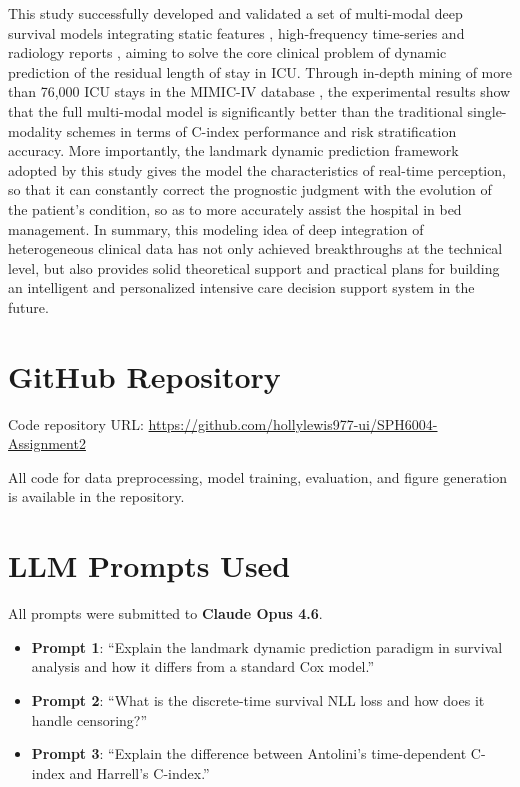 \documentclass[10pt, a4paper]{article}
\begin{document}
This study successfully developed and validated a set of multi-modal deep survival models integrating static features , high-frequency time-series and radiology reports , aiming to solve the core clinical problem of dynamic prediction of the residual length of stay  in ICU. Through in-depth mining of more than 76,000 ICU stays in the MIMIC-IV database , the experimental results show that the full multi-modal model is significantly better than the traditional single-modality schemes in terms of C-index performance and risk stratification  accuracy. More importantly, the landmark dynamic prediction framework adopted by this study gives the model the characteristics of real-time perception, so that it can constantly correct the prognostic judgment with the evolution of the patient's condition, so as to more accurately assist the hospital in bed management. In summary, this modeling idea of deep integration of heterogeneous clinical data has not only achieved breakthroughs at the technical level, but also provides solid theoretical support and practical plans for building an intelligent and personalized intensive care decision support system  in the future.

\appendix
\section{GitHub Repository}
\label{app:github}

Code repository URL: \url{https://github.com/hollylewis977-ui/SPH6004-Assignment2}

\noindent All code for data preprocessing, model training, evaluation, and figure generation is available in the repository.

\section{LLM Prompts Used}
\label{app:llm}

All prompts were submitted to \textbf{Claude Opus 4.6}.

\begin{itemize}[nosep, leftmargin=1.5cm]
    \item \textbf{Prompt 1}: ``Explain the landmark dynamic prediction paradigm in survival analysis and how it differs from a standard Cox model.''
    \item \textbf{Prompt 2}: ``What is the discrete-time survival NLL loss and how does it handle censoring?''
    \item \textbf{Prompt 3}: ``Explain the difference between Antolini's time-dependent C-index and Harrell's C-index.''
\end{itemize}
\end{document}
